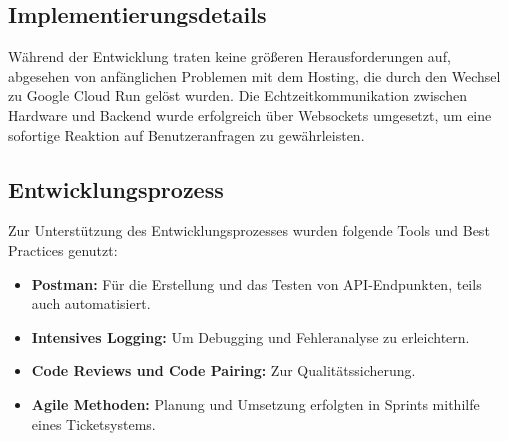 \subsection{Implementierungsdetails}

Während der Entwicklung traten keine größeren Herausforderungen auf, abgesehen von anfänglichen 
Problemen mit dem Hosting, die durch den Wechsel zu Google Cloud Run gelöst wurden. Die 
Echtzeitkommunikation zwischen Hardware und Backend wurde erfolgreich über Websockets umgesetzt, 
um eine sofortige Reaktion auf Benutzeranfragen zu gewährleisten.


\subsection{Entwicklungsprozess}

Zur Unterstützung des Entwicklungsprozesses wurden folgende Tools und Best Practices genutzt:
\begin{itemize}
	\item \textbf{Postman:} Für die Erstellung und das Testen von API-Endpunkten, teils auch automatisiert.
	\item \textbf{Intensives Logging:} Um Debugging und Fehleranalyse zu erleichtern.
	\item \textbf{Code Reviews und Code Pairing:} Zur Qualitätssicherung.
	\item \textbf{Agile Methoden:} Planung und Umsetzung erfolgten in Sprints mithilfe eines Ticketsystems.
\end{itemize}